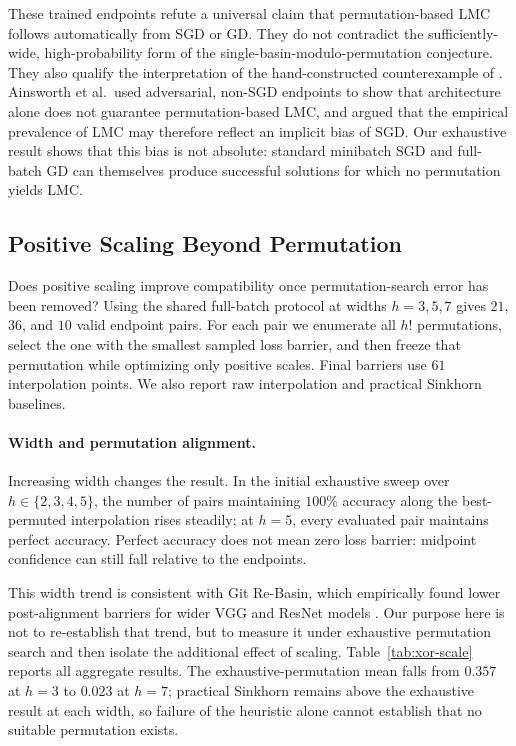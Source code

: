 \documentclass[twoside]{article}
\begin{document}
These trained endpoints refute a universal claim that permutation-based LMC
follows automatically from SGD or GD.  They do not contradict the
sufficiently-wide, high-probability form of the single-basin-modulo-permutation
conjecture.  They also qualify the
interpretation of the hand-constructed counterexample of
\citet{ainsworth2023git}.  Ainsworth et al.\ used adversarial, non-SGD
endpoints to show that architecture alone does not guarantee
permutation-based LMC, and argued that the empirical prevalence of LMC may
therefore reflect an implicit bias of SGD.  Our exhaustive result shows that
this bias is not absolute: standard minibatch SGD and full-batch GD can
themselves produce successful solutions for which no permutation yields LMC.

\subsection{Positive Scaling Beyond Permutation}
\label{sec:scale-results}

Does positive scaling improve compatibility once permutation-search error has
been removed?  Using the shared full-batch protocol at widths $h=3,5,7$ gives
$21$, $36$, and $10$ valid endpoint pairs.  For each pair we enumerate all
$h!$ permutations, select the one with the smallest sampled loss barrier, and
then freeze that permutation while optimizing only positive scales.  Final
barriers use $61$ interpolation points.  We also report raw interpolation and
practical Sinkhorn baselines.

\paragraph{Width and permutation alignment.}

Increasing width changes the result.  In the initial exhaustive sweep over
$h\in\{2,3,4,5\}$, the number of pairs maintaining $100\%$ accuracy along the
best-permuted interpolation rises steadily; at $h=5$, every evaluated pair
maintains perfect accuracy.  Perfect accuracy does not mean zero loss barrier:
midpoint confidence can still fall relative to the endpoints.

This width trend is consistent with Git Re-Basin, which empirically found lower
post-alignment barriers for wider VGG and ResNet models
\citep{ainsworth2023git}.  Our purpose here is not to re-establish that trend,
but to measure it under exhaustive permutation search and then isolate the
additional effect of scaling.  Table~\ref{tab:xor-scale} reports all aggregate
results.  The exhaustive-permutation mean falls from $0.357$ at $h=3$ to
$0.023$ at $h=7$; practical Sinkhorn remains above the exhaustive result at
each width, so failure of the heuristic alone cannot establish that no suitable
permutation exists.
\end{document}
